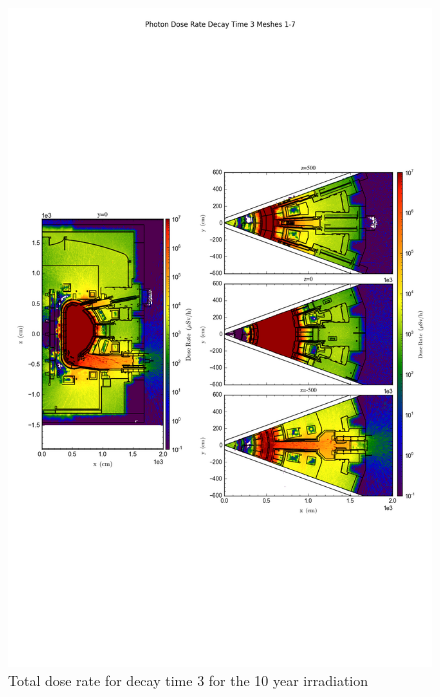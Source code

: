 \documentclass[12pt]{article}
\begin{document}
\clearpage
\begin{figure}[ht!]
\centering
\includegraphics[trim={0cm 8cm, 0cm 8cm},clip,scale=0.75]{../plots/final_model/10year/Photon_Dose_Rate_Decay_Time_3_Meshes_1-7.png}
\caption{Total dose rate for decay time 3 for the 10 year irradiation}
\label{fig:photons_10y_dc3_nob4c_dose}
\end{figure}
\end{document}
